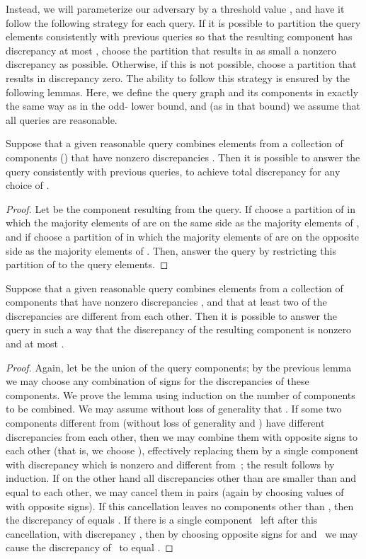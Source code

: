 \documentclass[11pt]{llncs}
\begin{document}
Instead, we will parameterize our adversary by a threshold value , and have it follow the following strategy for each query. If it is possible to partition the query elements consistently with previous queries so that the resulting component has discrepancy at most , choose the partition that results in as small a nonzero discrepancy as possible. Otherwise, if this is not possible, choose a partition that results in discrepancy zero. The ability to follow this strategy is ensured by the following lemmas. Here, we define the query graph and its components in exactly the same way as in the odd- lower bound, and (as in that bound) we assume that all queries are reasonable.

\begin{lemma}
Suppose that a given reasonable query combines elements from a collection of components () that have nonzero discrepancies . Then it is possible to answer the query consistently with previous queries, to achieve total discrepancy  for any choice of .
\end{lemma}

\begin{proof}
Let  be the component resulting from the query.
If  choose a partition of  in which the majority elements of  are on the same side as the majority elements of , and if  choose a partition of  in which the majority elements of  are on the opposite side as the majority elements of . Then, answer the query by restricting this partition of  to the query elements.
\end{proof}

\begin{lemma}
Suppose that a given reasonable query combines elements from a collection of components  that have nonzero discrepancies , and that at least two of the discrepancies  are different from each other. Then it is possible to answer the query in such a way that the discrepancy of the resulting component is nonzero and at most .
\end{lemma}

\begin{proof}
Again, let  be the union of the query components; by the previous lemma we may choose any combination of signs for the discrepancies of these components.
We prove the lemma using induction on the number of components to be combined. We may assume without loss of generality that . If some two components different from  (without loss of generality  and ) have different discrepancies from each other, then we may combine them with opposite signs to each other (that is, we choose ), effectively replacing them by a single component with discrepancy  which is nonzero and different from~; the result follows by induction. If on the other hand all discrepancies other than  are smaller than  and equal to each other, we may cancel them in pairs (again by choosing values of  with opposite signs). If this cancellation leaves no components other than , then the discrepancy of  equals . If there is a single component~ left after this cancellation, with discrepancy , then by choosing opposite signs for  and~ we may cause the discrepancy of~ to equal .
\end{proof}
\end{document}
